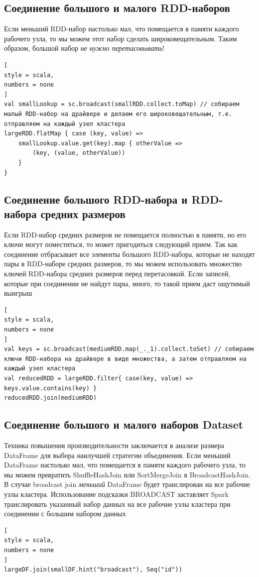\documentclass[%
	11pt,
	a4paper,
	utf8,
		]{article}
\begin{document}
\subsection{Соединение большого и малого RDD-наборов}

Если меньший RDD-набор настолько мал, что помещается в памяти каждого рабочего узла, то мы можем этот набор сделать широковещательным. Таким образом, большой набор \emph{не нужно перетасовывать}!
\begin{lstlisting}[
style = scala,
numbers = none	
]
val smallLookup = sc.broadcast(smallRDD.collect.toMap) // собираем малый RDD-набор на драйвере и делаем его широковещательным, т.е. отправляем на каждый узел кластера
largeRDD.flatMap { case (key, value) =>
	smallLookup.value.get(key).map { otherValue =>
		(key, (value, otherValue))
	}
}
\end{lstlisting}

\subsection{Соединение большого RDD-набора и RDD-набора средних размеров}

Если RDD-набор средних размеров не помещается полностью в памяти, но его ключи могут поместиться, то может пригодиться следующий прием. Так как соединение отбрасывает все элементы большого RDD-набора, которые не находят пары в RDD-наборе средних размеров, то мы можем использовать множество ключей RDD-набора средних размеров перед перетасовкой. Если записей, которые при соединении не найдут пары, много, то такой прием даст ощутимый выигрыш
\begin{lstlisting}[
style = scala,
numbers = none	
]
val keys = sc.broadcast(mediumRDD.map(_._1).collect.toSet) // собираем ключи RDD-набора на драйвере в виде множества, а затем отправляем на каждый узел кластера
val reducedRDD = largeRDD.filter{ case(key, value) => keys.value.contains(key) }
reducedRDD.join(mediumRDD)
\end{lstlisting}

\subsection{Соединение большого и малого наборов Dataset}

Техника повышения производительности заключается в анализе размера DataFrame для выбора наилучшей стратегии объединения. Если меньший DataFrame настолько мал, что помещается в памяти каждого рабочего узла, то мы можем превратить ShuffleHashJoin или SortMergeJoin в BroadcastHashJoin. В случае broadcast join \emph{меньший} DataFrame будет транслирован на все рабочие узлы кластера. Использование подсказки BROADCAST заставляет Spark транслировать указанный набор данных на все рабочие узлы кластера при соединении с большим набором данных
\begin{lstlisting}[
style = scala,
numbers = none	
]
largeDF.join(smallDF.hint("broadcast"), Seq("id"))
\end{lstlisting}
\end{document}
